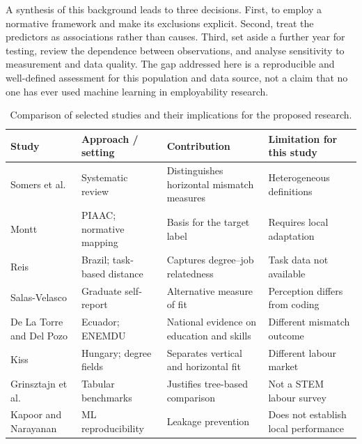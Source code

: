 A synthesis of this background leads to three decisions. First, to employ a normative framework and make its exclusions explicit. Second, treat the predictors as associations rather than causes. Third, set aside a further year for testing, review the dependence between observations, and analyse sensitivity to measurement and data quality. The gap addressed here is a reproducible and well-defined assessment for this population and data source, not a claim that no one has ever used machine learning in employability research. 
\begin{table}[htbp]
\caption{Comparison of selected studies and their implications for the proposed research.\label{tab:literature}}
\small\begin{tabularx}{\linewidth}{>{\raggedright\arraybackslash}p{.22\linewidth}*{3}{>{\raggedright\arraybackslash}X}}\toprule Study & Approach / setting & Contribution & Limitation for this study \\ \midrule
Somers et al. \cite{Somers2019} & Systematic review & Distinguishes horizontal mismatch measures & Heterogeneous definitions \\
Montt \cite{Montt2017} & PIAAC; normative mapping & Basis for the target label & Requires local adaptation \\
Reis \cite{Reis2018} & Brazil; task-based distance & Captures degree--job relatedness & Task data not available \\
Salas-Velasco \cite{Salas-Velasco2021} & Graduate self-report & Alternative measure of fit & Perception differs from coding \\
De La Torre and Del Pozo \cite{DeLaTorreB2025} & Ecuador; ENEMDU & National evidence on education and skills & Different mismatch outcome \\
Kiss \cite{Kiss2024} & Hungary; degree fields & Separates vertical and horizontal fit & Different labour market \\
Grinsztajn et al. \cite{Grinsztajn2022} & Tabular benchmarks & Justifies tree-based comparison & Not a STEM labour survey \\
Kapoor and Narayanan \cite{Kapoor2023} & ML reproducibility & Leakage prevention & Does not establish local performance \\
\bottomrule\end{tabularx}\end{table}
